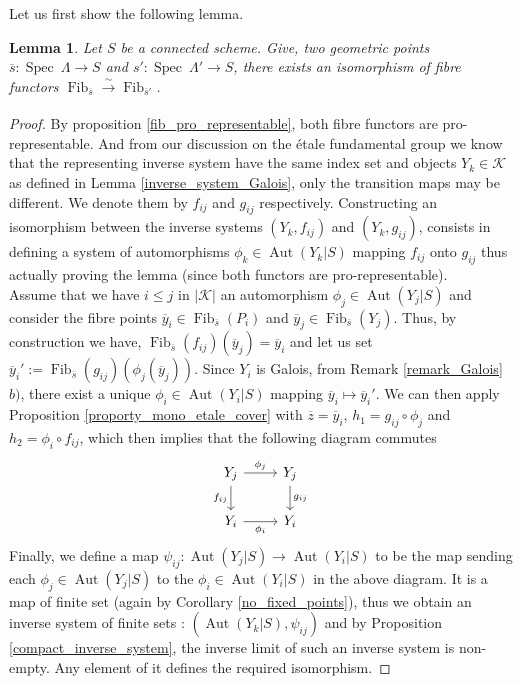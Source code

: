 \documentclass{article}
\theoremstyle{plain}
\newtheorem{lemma}[theorem]{Lemma}
\theoremstyle{definition}
\DeclareMathOperator{\Fib}{Fib}
\DeclareMathOperator{\Aut}{Aut}
\DeclareMathOperator{\Spec}{Spec}
\begin{document}
\noindent Let us first show the following lemma.
\begin{lemma}
\label{fiber_isomorphism}
    Let $S$ be a connected scheme. Give, two geometric points $\overline{s}:\Spec\:\Lambda\rightarrow S$ and $s':\Spec\:\Lambda'\rightarrow S$, there exists an isomorphism of fibre functors $\Fib_{\overline{s}}\xrightarrow[]{\sim}\Fib_{\overline{s}'}$.
\end{lemma}
\begin{proof}
    By proposition \ref{fib_pro_representable}, both fibre functors are pro-representable. And from our discussion on the \'etale fundamental group we know that the representing inverse system have the same index set and objects $Y_k\in \mathcal{K}$ as defined in Lemma \ref{inverse_system_Galois}, only the transition maps may be different. 
    We denote them by $f_{ij}$ and $g_{ij}$ respectively.
    Constructing an isomorphism between the inverse systems $(Y_k,f_{ij})$ and $(Y_k,g_{ij})$, consists in defining a system of automorphisms $\phi_k\in\Aut(Y_k|S)$ mapping $f_{ij}$ onto $g_{ij}$ thus actually proving the lemma (since both functors are pro-representable).\\
    Assume that we have $i\leq j$ in $|\mathcal{K}|$ an automorphism $\phi_j\in \Aut(Y_j|S)$ and consider the fibre points $\overline{y}_i\in \Fib_{\overline{s}}(P_i)$ and $\overline{y}_j\in\Fib_{\overline{s}}(Y_j)$.
    Thus, by construction we have, $\Fib_{\overline{s}}(f_{ij})(\overline{y}_j) = \overline{y}_i$ and let us set $\overline{y}_i':= \Fib_{\overline{s}}(g_{ij})(\phi_j(\overline{y}_j))$.
    Since $Y_i$ is Galois, from Remark \ref{remark_Galois} $b)$, there exist a unique $\phi_i\in\Aut(Y_i|S)$ mapping $\overline{y}_i\mapsto \overline{y}_i'$.
    We can then apply Proposition \ref{proporty_mono_etale_cover} with $\overline{z} = \overline{y}_i$, $h_1= g_{ij}\circ \phi_j$ and $h_2=\phi_i\circ f_{ij}$, which then implies that the following diagram commutes 
    \[
    \begin{tikzcd}
        Y_j \arrow[r,"\phi_j"] \arrow[d,"f_{ij}"'] & Y_j\arrow[d,"g_{ij}"]\\
        Y_i \arrow[r, "\phi_i"'] & Y_i
    \end{tikzcd}
    \]
    Finally, we define a map $\psi_{ij} : \Aut(Y_j|S)\rightarrow \Aut(Y_i|S)$ to be the map sending each $\phi_j\in\Aut(Y_j|S)$ to the $\phi_i\in\Aut(Y_i|S)$ in the above diagram.
    It is a map of finite set (again by Corollary \ref{no_fixed_points}), thus we obtain an inverse system of finite sets : $(\Aut(Y_k|S), \psi_{ij})$ and by Proposition \ref{compact_inverse_system}, the inverse limit of such an inverse system is non-empty.
    Any element of it defines the required isomorphism.
\end{proof}
\end{document}
